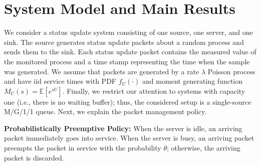 \documentclass[conference]{IEEEtran}
\def\blue{\textcolor{blue}}
\newcommand{\RY}[1]{{\color{red} RY: #1}}
\begin{document}
\section{System Model and Main Results}\label{System Model and Summary of Results}
We consider a status update system consisting of one source, one server, and one sink.
The source generates status update packets about a random process and sends them to the sink.  Each status update packet contains the measured value of the monitored process and a time stamp representing the time when the sample was generated. We assume that packets are generated by a rate $\lambda$ Poisson process and have 
iid service times with PDF $f_U(\cdot)$ and moment generating function $M_{U} (s) = \mathbb{E}[e^{sU}]$. %
Finally, we restrict our attention to systems with capacity one (i.e., there is no waiting buffer); thus, the considered setup is a single-source M/G/1/1 queue. Next, we explain the packet management policy. 

\smallskip

\noindent\textbf{Probabilistically Preemptive Policy:} %
When the server is idle, an arriving packet
immediately goes into service. When the server is busy, an arriving packet preempts the packet in service 
with the probability $\theta$; otherwise, the arriving packet is discarded.
\end{document}
